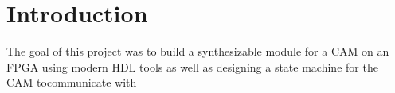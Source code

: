 \section{Introduction}
The goal of this project was to build a synthesizable module for a CAM on an FPGA using modern HDL tools as well as designing a state machine for the CAM tocommunicate with